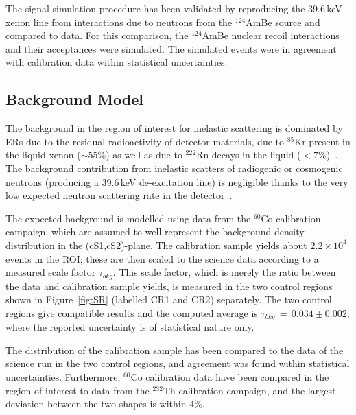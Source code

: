 The signal simulation procedure has been validated by reproducing the 39.6\,keV xenon line from interactions due to neutrons from the 
$^{124}$AmBe source and compared to data. For this comparison, the  $^{124}$AmBe nuclear recoil interactions and their acceptances
were simulated. The simulated events were in agreement  with calibration data within statistical uncertainties. 



\subsection {Background Model}

The background in the region of interest for inelastic scattering is dominated by ERs due to the residual radioactivity of detector materials, due to $^{85}$Kr present in the liquid xenon ($\sim$55\%) as well as due to $^{222}$Rn decays in the liquid ($<$7\%)~\cite{Aprile:2011vb}. The background contribution from inelastic scatters of radiogenic or cosmogenic neutrons (producing a 39.6\,keV de-excitation line) is negligible thanks to the very low expected neutron scattering rate in the detector~\cite{Aprile:2013tov}.


The expected background is modelled using data from the $^{60}$Co calibration campaign, which are assumed to well represent the background density distribution 
in the (cS1,cS2)-plane. The calibration sample yields  about $2.2\times10^4$ events in the ROI; these are then scaled to the science data according to a measured scale 
factor $\tau_{bkg}$. This scale factor, which is merely the ratio between the data and calibration sample yields, is measured in the two control regions shown in Figure~\ref{fig:SR} (labelled CR1 and CR2) separately. The two control regions give compatible results and the computed average is $\tau_{bkg} \, =  \, 0.034 \pm 0.002 $, where the reported uncertainty 
is of statistical nature only.

The distribution of the calibration sample has been compared to the data of the science run in the two control regions,
and agreement was found within statistical uncertainties. Furthermore, $^{60}$Co calibration data have been compared in the region of interest to  
data from the $^{232}$Th calibration campaign, and the largest deviation between the two shapes is within 4\%. 

